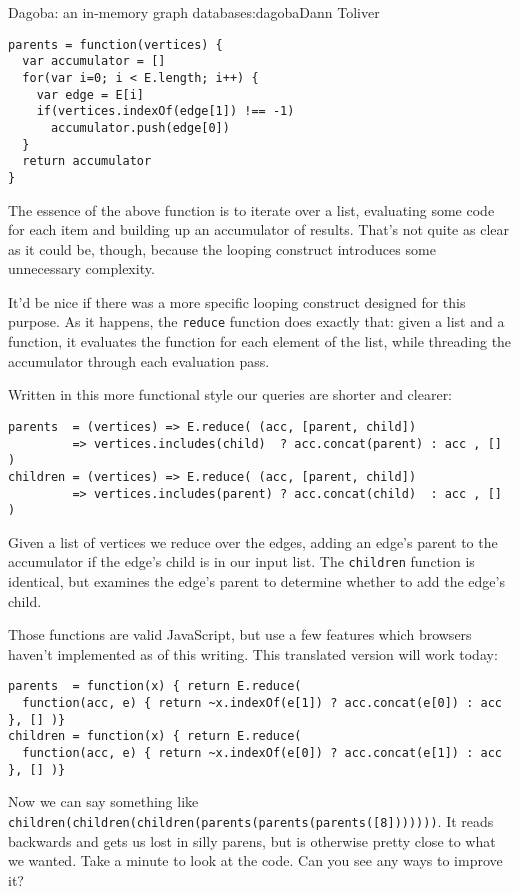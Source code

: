 \begin{aosachapter}{Dagoba: an in-memory graph database}{s:dagoba}{Dann Toliver}
\begin{verbatim}
parents = function(vertices) {
  var accumulator = []
  for(var i=0; i < E.length; i++) {
    var edge = E[i]
    if(vertices.indexOf(edge[1]) !== -1)
      accumulator.push(edge[0])
  }
  return accumulator
}
\end{verbatim}

The essence of the above function is to iterate over a list, evaluating
some code for each item and building up an accumulator of results.
That's not quite as clear as it could be, though, because the looping
construct introduces some unnecessary complexity.

It'd be nice if there was a more specific looping construct designed for
this purpose. As it happens, the \texttt{reduce} function does exactly
that: given a list and a function, it evaluates the function for each
element of the list, while threading the accumulator through each
evaluation pass.

Written in this more functional style our queries are shorter and
clearer:

\begin{verbatim}
parents  = (vertices) => E.reduce( (acc, [parent, child])
         => vertices.includes(child)  ? acc.concat(parent) : acc , [] )
children = (vertices) => E.reduce( (acc, [parent, child])
         => vertices.includes(parent) ? acc.concat(child)  : acc , [] )
\end{verbatim}

Given a list of vertices we reduce over the edges, adding an edge's
parent to the accumulator if the edge's child is in our input list. The
\texttt{children} function is identical, but examines the edge's parent
to determine whether to add the edge's child.

Those functions are valid JavaScript, but use a few features which
browsers haven't implemented as of this writing. This translated version
will work today:

\begin{verbatim}
parents  = function(x) { return E.reduce(
  function(acc, e) { return ~x.indexOf(e[1]) ? acc.concat(e[0]) : acc }, [] )}
children = function(x) { return E.reduce(
  function(acc, e) { return ~x.indexOf(e[0]) ? acc.concat(e[1]) : acc }, [] )}
\end{verbatim}

Now we can say something like
\texttt{children(children(children(parents(parents(parents({[}8{]}))))))}.
It reads backwards and gets us lost in silly parens, but is otherwise
pretty close to what we wanted. Take a minute to look at the code. Can
you see any ways to improve it?


\end{aosachapter}
